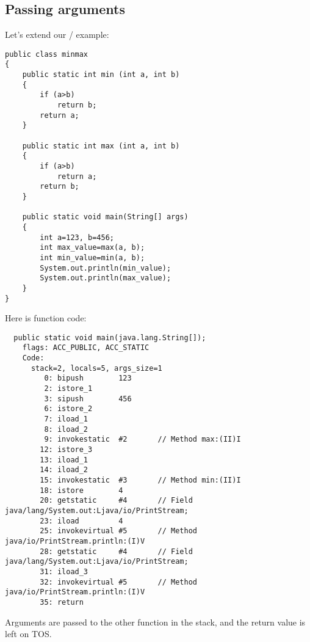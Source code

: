 \subsection{Passing arguments}

Let's extend our / example:


\begin{lstlisting}
public class minmax
{
	public static int min (int a, int b)
	{
		if (a>b)
			return b;
		return a;
	}

	public static int max (int a, int b)
	{
		if (a>b)
			return a;
		return b;
	}

	public static void main(String[] args)
	{
		int a=123, b=456;
		int max_value=max(a, b);
		int min_value=min(a, b);
		System.out.println(min_value);
		System.out.println(max_value);
	}
}
\end{lstlisting}

Here is \main function code:


\begin{lstlisting}
  public static void main(java.lang.String[]);
    flags: ACC_PUBLIC, ACC_STATIC
    Code:
      stack=2, locals=5, args_size=1
         0: bipush        123
         2: istore_1      
         3: sipush        456
         6: istore_2      
         7: iload_1       
         8: iload_2       
         9: invokestatic  #2       // Method max:(II)I
        12: istore_3      
        13: iload_1       
        14: iload_2       
        15: invokestatic  #3       // Method min:(II)I
        18: istore        4
        20: getstatic     #4       // Field java/lang/System.out:Ljava/io/PrintStream;
        23: iload         4
        25: invokevirtual #5       // Method java/io/PrintStream.println:(I)V
        28: getstatic     #4       // Field java/lang/System.out:Ljava/io/PrintStream;
        31: iload_3       
        32: invokevirtual #5       // Method java/io/PrintStream.println:(I)V
        35: return        
\end{lstlisting}

Arguments are passed to the other function in the stack, and the return value is left on \ac{TOS}.


